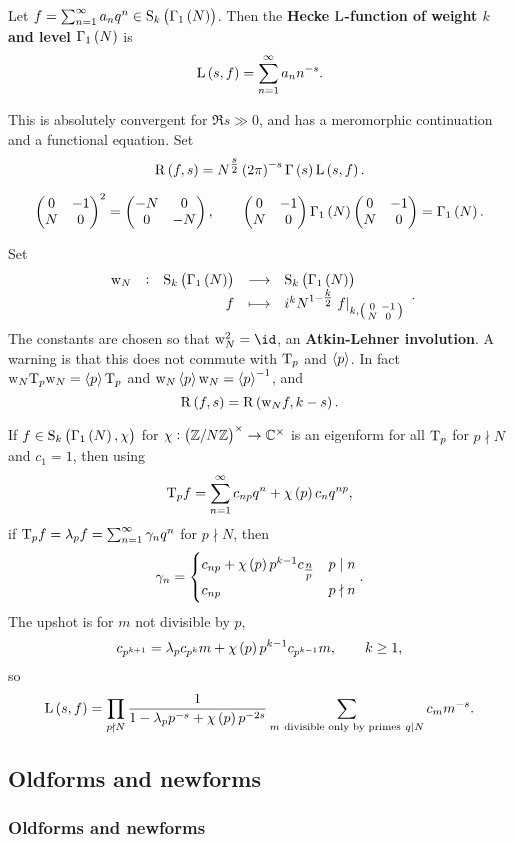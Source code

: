 \begin{definition}
Let $ f = \sum_{n = 1}^\infty a_nq^n \in \S_k\br{\Gamma_1\br{N}} $. Then the \textbf{Hecke $ \mathrm{L} $-function of weight $ k $ and level $ \Gamma_1\br{N} $} is
$$ \L\br{s, f} = \sum_{n = 1}^\infty a_nn^{-s}. $$
\end{definition}

This is absolutely convergent for $ \Re s \gg 0 $, and has a meromorphic continuation and a functional equation. Set
$$ \R\br{f, s} = N^{\tfrac{s}{2}}\br{2\pi}^{-s}\Gamma\br{s}\L\br{s, f}. $$

\begin{note*}
$$ \twobytwo{0}{-1}{N}{0}^2 = \twobytwo{-N}{0}{0}{-N}, \qquad \twobytwo{0}{-1}{N}{0}\Gamma_1\br{N}\twobytwo{0}{-1}{N}{0} = \Gamma_1\br{N}. $$
\end{note*}

Set
$$ \function[\w_N]{\S_k\br{\Gamma_1\br{N}}}{\S_k\br{\Gamma_1\br{N}}}{f}{i^kN^{1 - \tfrac{k}{2}}\eval{f}_{k, \twobytwosmall{0}{-1}{N}{0}}}. $$
The constants are chosen so that $ \w_N^2 = \id $, an \textbf{Atkin-Lehner involution}. A warning is that this does not commute with $ \mathrm{T}_p $ and $ \left\langle p \right\rangle $. In fact $ \mathrm{w}_N\mathrm{T}_p\mathrm{w}_N = \left\langle p \right\rangle\mathrm{T}_p $ and $ \mathrm{w}_N\left\langle p \right\rangle\mathrm{w}_N = \left\langle p \right\rangle^{-1} $, and
$$ \R\br{f, s} = \R\br{\w_Nf, k - s}. $$

If $ f \in \S_k\br{\Gamma_1\br{N}, \chi} $ for $ \chi : \br{\ZZ / N\ZZ}^\times \to \CC^\times $ is an eigenform for all $ \mathrm{T}_p $ for $ p \nmid N $ and $ c_1 = 1 $, then using
$$ \T_pf = \sum_{n = 1}^\infty c_{np}q^n + \chi\br{p}c_nq^{np}, $$
if $ \mathrm{T}_pf = \lambda_pf = \sum_{n = 1}^\infty \gamma_nq^n $ for $ p \nmid N $, then
$$ \gamma_n =
\begin{cases}
c_{np} + \chi\br{p}p^{k - 1}c_{\tfrac{n}{p}} & p \mid n \\
c_{np} & p \nmid n
\end{cases}.
$$
The upshot is for $ m $ not divisible by $ p $,
$$ c_{p^{k + 1}} = \lambda_pc_{p^k}m + \chi\br{p}p^{k - 1}c_{p^{k - 1}}m, \qquad k \ge 1, $$
so
$$ \L\br{s, f} = \prod_{p \nmid N} \dfrac{1}{1 - \lambda_pp^{-s} + \chi\br{p}p^{-2s}}\sum_{m \ \text{divisible only by primes} \ q \mid N} c_mm^{-s}. $$

\subsection{Oldforms and newforms}

\subsubsection{Oldforms and newforms}

